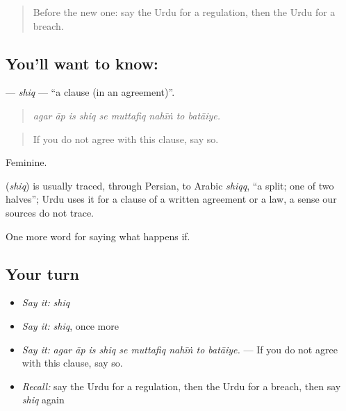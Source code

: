 \label{lesson:UR-C367-shiq}



\begin{quote}
Before the new one: say the Urdu for a regulation, then the Urdu for a breach.
\end{quote}

\subsection*{You'll want to know: }
\textbf{} — \emph{shiq} — \textquotedblleft{}a clause (in an agreement)\textquotedblright{}.

\begin{quote}
        
\end{quote}

\begin{quote}
\emph{agar āp is shiq se muttafiq nahīṅ to batāiye.}
\end{quote}

\begin{quote}
If you do not agree with this clause, say so.
\end{quote}

Feminine.

\begin{cousinweb}
\textbf{} (\emph{shiq}) is usually traced, through Persian, to Arabic \emph{shiqq}, \textquotedblleft{}a split; one of two halves\textquotedblright{}; Urdu uses it for a clause of a written agreement or a law, a sense our sources do not trace.
\end{cousinweb}

\begin{grammarlens}[title={What you've built}]
One more word for saying what happens if.
\end{grammarlens}

\subsection*{Your turn}
\begin{itemize}
\raggedright
  \item \emph{Say it:} \emph{shiq}
  \item \emph{Say it:} \emph{shiq}, once more
  \item \emph{Say it:} \emph{agar āp is shiq se muttafiq nahīṅ to batāiye.} — If you do not agree with this clause, say so.
  \item \emph{Recall:} say the Urdu for a regulation, then the Urdu for a breach, then say \emph{shiq} again
\end{itemize}

